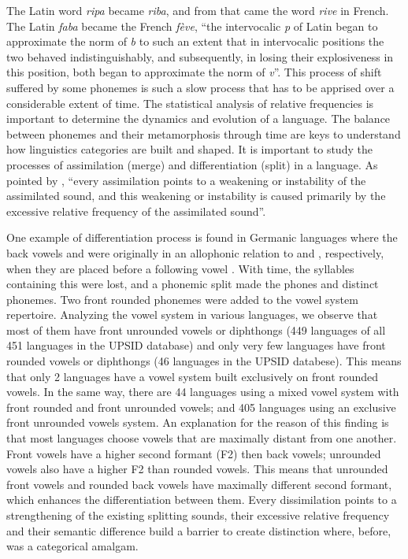 The Latin word \textit{ripa} became \textit{riba}, and from that came the word \textit{rive} in French. The Latin \textit{faba} became the French \textit{fève}, ``the intervocalic \textit{p} of Latin began to approximate the norm of \textit{b} to such an extent that in intervocalic positions the two behaved indistinguishably, and subsequently, in losing their explosiveness in this position, both began to approximate the norm of \textit{v}''\citep{zipf1949}. This process of shift suffered by some phonemes is such a slow process that has to be apprised over a considerable extent of time. The statistical analysis of relative frequencies is important to determine the dynamics and evolution of a language. The balance between phonemes and their metamorphosis through time are keys to understand how linguistics categories are built and shaped. It is important to study the processes of assimilation (merge) and differentiation (split) in a language. As pointed by \cite{zipf1949}, ``every assimilation points to a weakening or instability of the assimilated sound, and this weakening or instability is caused primarily by the excessive relative frequency of the assimilated sound''.

One example of differentiation process is found in Germanic languages where the back vowels \textipa{[u]} and \textipa{[o]} were originally in an allophonic relation to \textipa{[y]} and \textipa{[\o]}, respectively, when they are placed before a following vowel . With time, the syllables containing this  were lost, and a phonemic split made the phones  and \textipa{/\o/} distinct phonemes. Two front rounded phonemes were added to the vowel system repertoire. Analyzing the vowel system in various languages, we observe that most of them have front unrounded vowels or diphthongs (449 languages of all 451 languages in the UPSID database) and only very few languages have front rounded vowels or diphthongs (46 languages in the UPSID databese). This means that only 2 languages have a vowel system built exclusively on front rounded vowels. In the same way, there are 44 languages using a mixed vowel system with front rounded and front unrounded vowels; and 405 languages using an exclusive front unrounded vowels system. An explanation for the reason of this finding is that most languages choose vowels that are maximally distant from one another. Front vowels have a higher second formant (F2) then back vowels; unrounded vowels also have a higher F2 than rounded vowels. This means that unrounded front vowels and rounded back vowels have maximally different second formant, which enhances the differentiation between them. Every dissimilation points to a strengthening of the existing splitting sounds, their excessive relative frequency and their semantic difference build a barrier to create distinction where, before, was a categorical amalgam.

